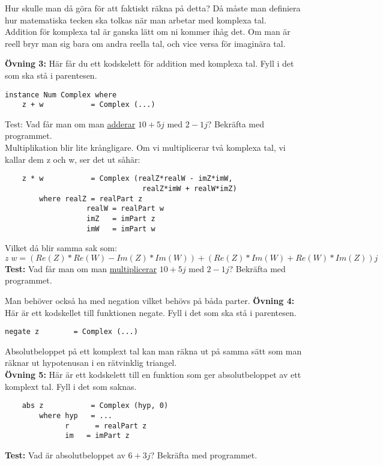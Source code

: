 \documentclass{article}
\begin{document}
Hur skulle man då göra för att faktiskt räkna på detta? Då måste man definiera hur matematiska tecken ska tolkas när man arbetar med komplexa tal.\\

Addition för komplexa tal är ganska lätt om ni kommer ihåg det. Om man är reell bryr man sig bara om andra reella tal, och vice versa för imaginära tal. 

\textbf{Övning 3:} Här får du ett kodskelett för addition med komplexa tal. Fyll i det som ska stå i parentesen.
\begin{verbatim}
instance Num Complex where
    z + w           = Complex (...)
\end{verbatim}
Test: Vad får man om man \underline{adderar} $10 + 5j$ med $2 -1j$? Bekräfta med programmet.\\

Multiplikation blir lite krångligare. Om vi multiplicerar två komplexa tal, vi kallar dem z och w, ser det ut såhär:
\begin{verbatim}
    z * w           = Complex (realZ*realW - imZ*imW, 
                                realZ*imW + realW*imZ)
        where realZ = realPart z
                   realW = realPart w
                   imZ   = imPart z
                   imW   = imPart w
\end{verbatim}
Vilket då blir samma sak som:
$$z \; w = (Re(Z) * Re(W) - Im(Z)*Im(W)) + (Re(Z)*Im(W) + Re(W)*Im(Z))j$$
\textbf{Test:} Vad får man om man \underline{multiplicerar} $10 + 5j$ med $2 -1j$? Bekräfta med programmet.

Man behöver också ha med negation vilket behövs på båda parter. 
\textbf{Övning 4:} Här är ett kodskellet till funktionen negate. Fyll i det som ska stå i parentesen.
\begin{verbatim}
negate z        = Complex (...)
\end{verbatim}
Absolutbeloppet på ett komplext tal kan man räkna ut på samma sätt som man räknar ut hypotenusan i en rätvinklig triangel.\\

\textbf{Övning 5:} Här är ett kodskelett till en funktion som ger absolutbeloppet av ett komplext tal. Fyll i det som saknas.
\begin{verbatim}
    abs z           = Complex (hyp, 0)
        where hyp   = ...
              r      = realPart z
              im   = imPart z
\end{verbatim}
\textbf{Test:} Vad är absolutbeloppet av $6 + 3j$? Bekräfta med programmet.
\end{document}
